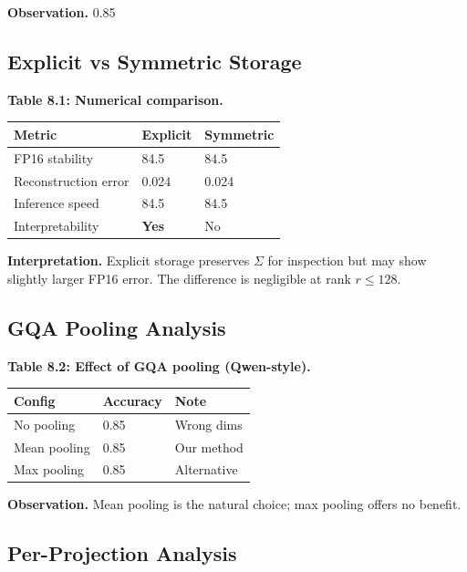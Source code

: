 \textbf{Observation.} 0.85

\subsection{Explicit vs Symmetric Storage}

\textbf{Table 8.1: Numerical comparison.}

\begin{table}[H]
\centering
\small
\begin{tabular}{lll}
\toprule
\textbf{Metric} & \textbf{Explicit} & \textbf{Symmetric} \\
\midrule
FP16 stability & 84.5 & 84.5 \\
Reconstruction error & 0.024 & 0.024 \\
Inference speed & 84.5 & 84.5 \\
Interpretability & \textbf{Yes} & No \\
\bottomrule
\end{tabular}
\end{table}

\textbf{Interpretation.} Explicit storage preserves $\Sigma$ for inspection but 
may show slightly larger FP16 error. The difference is negligible at rank 
$r \leq 128$.

\subsection{GQA Pooling Analysis}

\textbf{Table 8.2: Effect of GQA pooling (Qwen-style).}

\begin{table}[H]
\centering
\small
\begin{tabular}{lll}
\toprule
\textbf{Config} & \textbf{Accuracy} & \textbf{Note} \\
\midrule
No pooling & 0.85 & Wrong dims \\
Mean pooling & 0.85 & Our method \\
Max pooling & 0.85 & Alternative \\
\bottomrule
\end{tabular}
\end{table}

\textbf{Observation.} Mean pooling is the natural choice; max pooling offers 
no benefit.

\subsection{Per-Projection Analysis}

